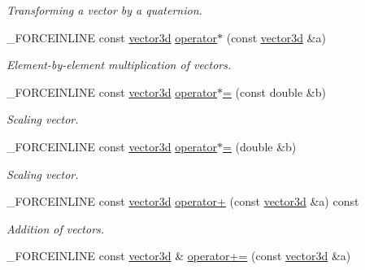 \begin{DoxyCompactItemize}
\begin{DoxyCompactList}\small\item\em Transforming a vector by a quaternion. \end{DoxyCompactList}\item 
\hypertarget{classbt_1_1vector3d_a6a7e69cc66b1de74a6219b695899e44b}{\-\_\-\-F\-O\-R\-C\-E\-I\-N\-L\-I\-N\-E const \hyperlink{classbt_1_1vector3d}{vector3d} \hyperlink{classbt_1_1vector3d_a6a7e69cc66b1de74a6219b695899e44b}{operator$\ast$} (const \hyperlink{classbt_1_1vector3d}{vector3d} \&a)}\label{classbt_1_1vector3d_a6a7e69cc66b1de74a6219b695899e44b}

\begin{DoxyCompactList}\small\item\em Element-\/by-\/element multiplication of vectors. \end{DoxyCompactList}\item 
\hypertarget{classbt_1_1vector3d_ad7a72d6c92e823c46f0b1b2d71a3a38c}{\-\_\-\-F\-O\-R\-C\-E\-I\-N\-L\-I\-N\-E const \hyperlink{classbt_1_1vector3d}{vector3d} \hyperlink{classbt_1_1vector3d_ad7a72d6c92e823c46f0b1b2d71a3a38c}{operator$\ast$=} (const double \&b)}\label{classbt_1_1vector3d_ad7a72d6c92e823c46f0b1b2d71a3a38c}

\begin{DoxyCompactList}\small\item\em Scaling vector. \end{DoxyCompactList}\item 
\hypertarget{classbt_1_1vector3d_adc1b5287525399650ddbd055b642194d}{\-\_\-\-F\-O\-R\-C\-E\-I\-N\-L\-I\-N\-E const \hyperlink{classbt_1_1vector3d}{vector3d} \hyperlink{classbt_1_1vector3d_adc1b5287525399650ddbd055b642194d}{operator$\ast$=} (double \&b)}\label{classbt_1_1vector3d_adc1b5287525399650ddbd055b642194d}

\begin{DoxyCompactList}\small\item\em Scaling vector. \end{DoxyCompactList}\item 
\hypertarget{classbt_1_1vector3d_aef678562a34600fd2f89d7130a3ec5e0}{\-\_\-\-F\-O\-R\-C\-E\-I\-N\-L\-I\-N\-E const \hyperlink{classbt_1_1vector3d}{vector3d} \hyperlink{classbt_1_1vector3d_aef678562a34600fd2f89d7130a3ec5e0}{operator+} (const \hyperlink{classbt_1_1vector3d}{vector3d} \&a) const }\label{classbt_1_1vector3d_aef678562a34600fd2f89d7130a3ec5e0}

\begin{DoxyCompactList}\small\item\em Addition of vectors. \end{DoxyCompactList}\item 
\hypertarget{classbt_1_1vector3d_a5d1342893339c2f2f70a51b215554b9e}{\-\_\-\-F\-O\-R\-C\-E\-I\-N\-L\-I\-N\-E const \hyperlink{classbt_1_1vector3d}{vector3d} \& \hyperlink{classbt_1_1vector3d_a5d1342893339c2f2f70a51b215554b9e}{operator+=} (const \hyperlink{classbt_1_1vector3d}{vector3d} \&a)}\label{classbt_1_1vector3d_a5d1342893339c2f2f70a51b215554b9e}


\end{DoxyCompactItemize}

